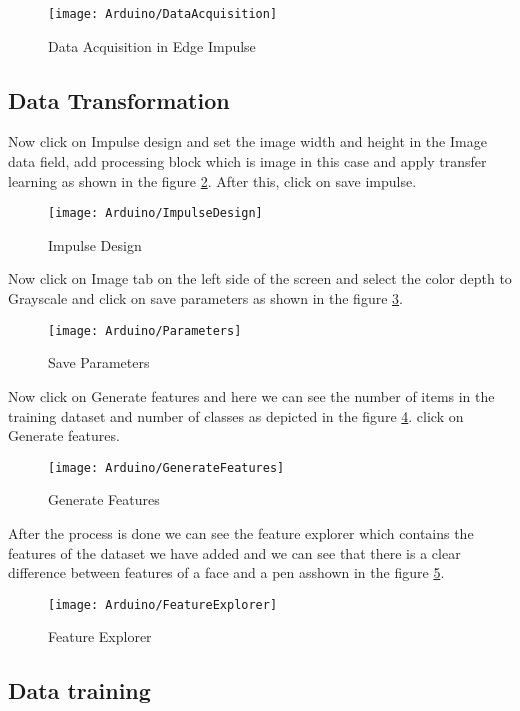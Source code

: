 \begin{figure}
	\centering
	\texttt{[image: Arduino/DataAcquisition]}
	\caption{Data Acquisition in Edge Impulse}
	\label{figure 9.4}
\end{figure}

\subsection{Data Transformation}
Now click on  Impulse design and set the image width and height in the Image data field, add processing block which is image in this case and apply transfer learning as shown in the figure \ref{figure 9.5}. After this, click on save impulse.

\begin{figure}
	\centering
	\texttt{[image: Arduino/ImpulseDesign]}
	\caption{Impulse Design}
	\label{figure 9.5}
\end{figure}

Now click on Image tab on the left side of the screen and select the color depth to Grayscale and click on save parameters as shown in the figure \ref{figure 9.6}.

\begin{figure}
	\centering
	\texttt{[image: Arduino/Parameters]}
	\caption{Save Parameters}
	\label{figure 9.6}
\end{figure}

Now click on Generate features and here we can see the number of items in the training dataset and number of classes as depicted in the figure \ref{figure 9.7}.  click on Generate features. 

\begin{figure}
	\centering
	\texttt{[image: Arduino/GenerateFeatures]}
	\caption{Generate Features}
	\label{figure 9.7}
\end{figure}

After the process is done we can see the feature explorer which contains the features of the dataset we have added and we can see that there is a clear difference between features of a face and a pen asshown in the figure \ref{figure 9.8}.

\begin{figure}
	\centering
	\texttt{[image: Arduino/FeatureExplorer]}
	\caption{Feature Explorer }
	\label{figure 9.8}
\end{figure}

\subsection{Data training }

